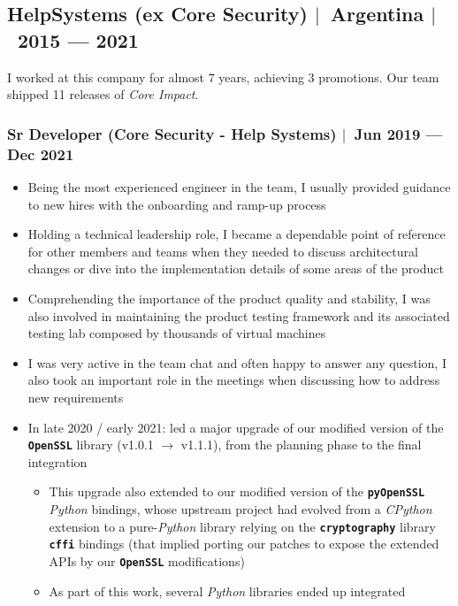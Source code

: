 \documentclass[12pt, a4paper]{article}
\newcommand{\mysep}{{\Large $\mid$}\ }
\newcommand{\lib}[1]{\texttt{\textbf{#1}}}
\newcommand{\python}{\emph{Python}}
\begin{document}
    \subsection*{HelpSystems (ex Core Security) \mysep Argentina \mysep 2015 --- 2021} \label{subsec:job1}
    I worked at this company for almost 7 years, achieving 3 promotions.
    Our team shipped 11 releases of \emph{Core Impact}.

    \subsubsection*{Sr Developer (Core Security - Help Systems) \mysep Jun 2019 --- Dec 2021}
    \begin{itemize}
        \item Being the most experienced engineer in the team, I usually
        provided guidance to new hires with the onboarding and ramp-up process
        \item Holding a technical leadership role, I became
        a dependable point of reference for other members and teams
        when they needed to discuss architectural changes
        or dive into the implementation details of some areas of the product
        \item Comprehending the importance of the product quality and stability,
        I was also involved in maintaining the product testing framework
        and its associated testing lab composed by thousands of virtual machines
        \item I was very active in the team chat
        and often happy to answer any question,
        I also took an important role in the meetings
        when discussing how to address new requirements
        \item In late 2020 / early 2021: led a major upgrade of
        our modified version of the \lib{OpenSSL} library (v1.0.1 $\rightarrow$ v1.1.1),
        from the planning phase to the final integration
        \begin{itemize}
            \item This upgrade also extended to our modified version of the \lib{pyOpenSSL} \python{} bindings,
            whose upstream project had evolved from a \emph{CPython} extension to a pure-\python{} library
            relying on the \lib{cryptography} library \lib{cffi} bindings
            (that implied porting our patches to expose the extended APIs by our \lib{OpenSSL} modifications)
            \item As part of this work, several \python{} libraries ended up integrated

\end{itemize}
\end{itemize}
\end{document}

